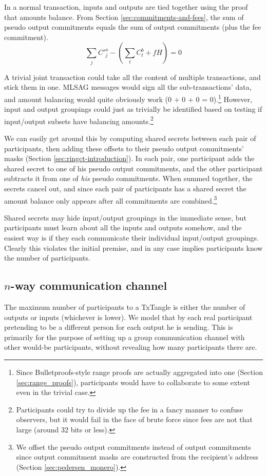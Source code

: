 In a normal transaction, inputs and outputs are tied together using the proof that amounts balance. From Section \ref{sec:commitments-and-fees}, the sum of pseudo output commitments equals the sum of output commitments (plus the fee commitment).
\[\sum_j C'^a_{j} - (\sum_t C^b_{t} + f H) = 0\]

A trivial joint transaction could take all the content of multiple transactions, and stick them in one. MLSAG messages would sign all the sub-transactions' data, and amount balancing would quite obviously work (0 + 0 + 0 = 0).\footnote{Since Bulletproofs-style range proofs are actually aggregated into one (Section \ref{sec:range_proofs}), participants would have to collaborate to some extent even in the trivial case.} However, input and output groupings could just as trivially be identified based on testing if input/output subsets have balancing amounts.\footnote{Participants could try to divide up the fee in a fancy manner to confuse observers, but it would fail in the face of brute force since fees are not that large (around 32 bits or less).}

We can easily get around this by computing shared secrets between each pair of participants, then adding these offsets to their pseudo output commitments' masks (Section \ref{sec:ringct-introduction}). In each pair, one participant adds the shared secret to one of his pseudo output commitments, and the other participant subtracts it from one of {\em his} pseudo commitments. When summed together, the secrets cancel out, and since each pair of participants has a shared secret the amount balance only appears after all commitments are combined.\footnote{We offset the pseudo output commitments instead of output commitments since output commitment masks are constructed from the recipient's address (Section \ref{sec:pedersen_monero}).}

Shared secrets may hide input/output groupings in the immediate sense, but participants must learn about all the inputs and outputs somehow, and the easiest way is if they each communicate their individual input/output groupings. Clearly this violates the initial premise, and in any case implies participants know the number of participants.


\subsection{$n$-way communication channel}
\label{subsec:n-way-channel}

The maximum number of participants to a TxTangle is either the number of outputs or inputs (whichever is lower). We model that by each real participant pretending to be a different person for each output he is sending. This is primarily for the purpose of setting up a group communication channel with other would-be participants, without revealing how many participants there are.

